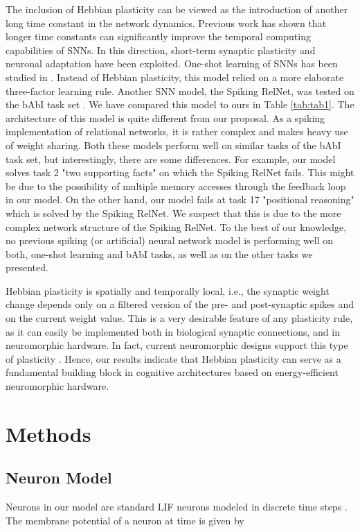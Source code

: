 \documentclass{article}
\begin{document}
The inclusion of Hebbian plasticity can be viewed as the introduction of another long time constant in the network dynamics. Previous work has shown that longer time constants can significantly improve the temporal computing capabilities of SNNs. In this direction, short-term synaptic plasticity \cite{mongillo2008synaptic,maass2002real} and neuronal adaptation \cite{salaj2021spike} have been exploited. One-shot learning of SNNs has been studied in \cite{scherr2020one}. Instead of Hebbian plasticity, this model relied on a more elaborate three-factor learning rule. Another SNN model, the Spiking RelNet, was tested on the bAbI task set \cite{plank2021long}. We have compared this model to ours in Table \ref{tab:tab1}. The architecture of this model is quite different from our proposal. As a spiking implementation of relational networks, it is rather complex and makes heavy use of weight sharing. Both these models perform well on similar tasks of the bAbI task set, but interestingly, there are some differences. For example, our model solves task \num{2} "two supporting facts" on which the Spiking RelNet fails. This might be due to the possibility of multiple memory accesses through the feedback loop in our model. On the other hand, our model fails at task \num{17} "positional reasoning" which is solved by the Spiking RelNet. We suspect that this is due to the more complex network structure of the Spiking RelNet.
To the best of our knowledge, no previous spiking (or artificial) neural network model is performing well on both, one-shot learning and bAbI tasks, as well as on the other tasks we presented.

Hebbian plasticity is spatially and temporally local, i.e., the synaptic weight change depends only on a filtered version of the pre- and post-synaptic spikes and on the current weight value. This is a very desirable feature of any plasticity rule, as it can easily be implemented both in biological synaptic connections, and in neuromorphic hardware. In fact, current neuromorphic designs support this type of plasticity \cite{davies2018loihi}. Hence, our results indicate that Hebbian plasticity can serve as a fundamental building block in cognitive architectures based on energy-efficient neuromorphic hardware.

\section{Methods}

\subsection{Neuron Model}
\label{sec:methods-neuron_model}
Neurons in our model are standard \gls{LIF} neurons modeled in discrete time steps . The membrane potential  of a neuron  at time  is given by
\end{document}
